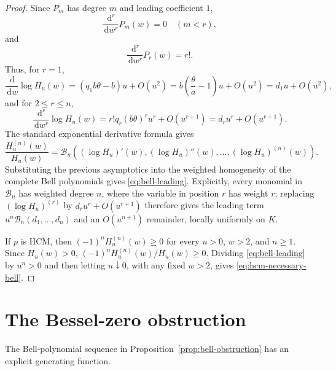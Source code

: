 ﻿\documentclass[preprint,12pt,authoryear]{elsarticle}
\newcommand{\dd}{\,\mathrm{d}}
\begin{document}
\begin{proof}
Since \(P_m\) has degree \(m\) and leading coefficient \(1\),
\begin{equation}
\frac{\dd^r}{\dd w^r}P_m(w)=0
\quad(m<r),
\end{equation}
and
\begin{equation}
\frac{\dd^r}{\dd w^r}P_r(w)=r!.
\end{equation}
Thus, for \(r=1\),
\begin{equation}
\frac{\dd}{\dd w}\log H_u(w)
=
\left(q_1b\theta-b\right)u+O(u^2)
=
b\left(\frac{\theta}{a}-1\right)u+O(u^2)
=
d_1u+O(u^2),
\end{equation}
and for \(2\le r\le n\),
\begin{equation}
\frac{\dd^r}{\dd w^r}\log H_u(w)
=
r!q_r(b\theta)^r u^r+O(u^{r+1})
=
d_ru^r+O(u^{r+1}).
\end{equation}
The standard exponential derivative formula gives
\begin{equation}
\frac{H_u^{(n)}(w)}{H_u(w)}
=
\mathcal B_n
\left(
(\log H_u)'(w),
(\log H_u)''(w),
\dots,
(\log H_u)^{(n)}(w)
\right).
\end{equation}
Substituting the previous asymptotics into the weighted homogeneity of the complete Bell polynomials gives \eqref{eq:bell-leading}.  Explicitly, every monomial in \(\mathcal B_n\) has weighted degree \(n\), where the variable in position \(r\) has weight \(r\); replacing \((\log H_u)^{(r)}\) by \(d_ru^r+O(u^{r+1})\) therefore gives the leading term \(u^n\mathcal B_n(d_1,\dots,d_n)\) and an \(O(u^{n+1})\) remainder, locally uniformly on \(K\).

If \(p\) is HCM, then \((-1)^nH_u^{(n)}(w)\ge0\) for every \(u>0\), \(w>2\), and \(n\ge1\).  Since \(H_u(w)>0\), \((-1)^nH_u^{(n)}(w)/H_u(w)\ge0\).  Dividing \eqref{eq:bell-leading} by \(u^n>0\) and then letting \(u\downarrow0\), with any fixed \(w>2\), gives \eqref{eq:hcm-necessary-bell}.
\end{proof}

\section{The Bessel-zero obstruction}

The Bell-polynomial sequence in Proposition~\ref{prop:bell-obstruction} has an explicit generating function.
\end{document}
